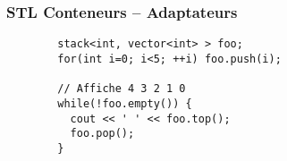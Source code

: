 \documentclass[C++.tex]{subfiles}
\begin{document}
\begin{frame}[fragile]
	\frametitle{STL Conteneurs -- Adaptateurs}
	\begin{verbatim}
		stack<int, vector<int> > foo;
		for(int i=0; i<5; ++i) foo.push(i);

		// Affiche 4 3 2 1 0
		while(!foo.empty()) {
		  cout << ' ' << foo.top();
		  foo.pop();
		}
	\end{verbatim}

\end{frame}
\end{document}
